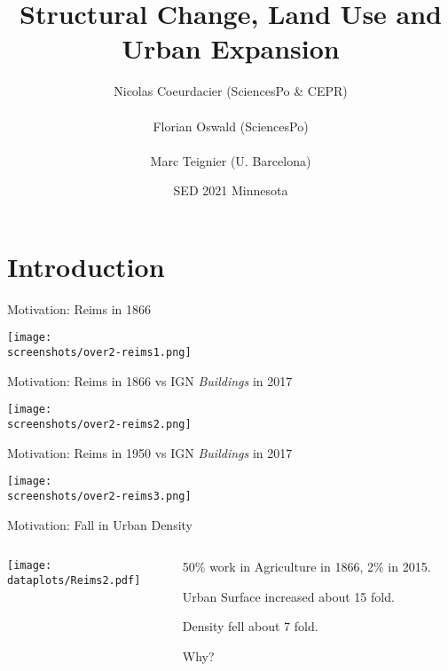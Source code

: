 \documentclass[aspectratio=169]{beamer}
\begin{document}
\title{\textbf{Structural Change, Land Use and Urban Expansion}}
\author{Nicolas Coeurdacier (SciencesPo \& CEPR)\\ \ \\Florian Oswald (SciencesPo) \\ \ \\ Marc Teignier (U. Barcelona)}
\date{SED 2021 Minnesota}


\frame{\titlepage}



\section{Introduction}

\begin{frame}{Motivation: Reims in 1866}
\begin{adjustbox}{center}
\texttt{[image: \\screenshots/over2-reims1.png]}\end{adjustbox}
\end{frame}

\begin{frame}{Motivation: Reims in 1866 vs IGN \emph{Buildings} in 2017}
\begin{adjustbox}{center}
\texttt{[image: \\screenshots/over2-reims2.png]}\end{adjustbox}
\end{frame}

\begin{frame}{Motivation: Reims in 1950 vs IGN \emph{Buildings} in 2017}
\begin{adjustbox}{center}
\texttt{[image: \\screenshots/over2-reims3.png]}\end{adjustbox}
\end{frame}

\begin{frame}{Motivation: Fall in Urban Density}
\begin{columns}
\begin{column}{0.7\textwidth}
\texttt{[image: \\dataplots/Reims2.pdf]}
\end{column}
\begin{column}{0.3\textwidth}
\begin{midi}
\item 50\% work in Agriculture in 1866, 2\% in 2015.
\item Urban Surface increased about 15 fold.
\item Density fell about 7 fold.
\item Why?
\end{midi}

\end{column}
\end{columns}
\end{frame}
\end{document}
